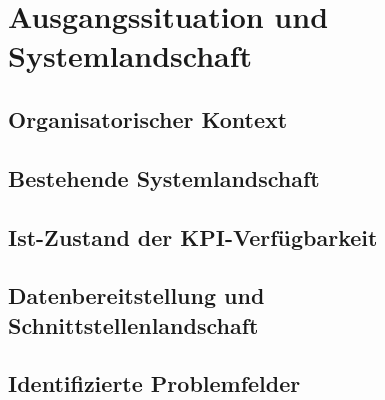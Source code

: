 \section{Ausgangssituation und Systemlandschaft}

\subsection{Organisatorischer Kontext}

\subsection{Bestehende Systemlandschaft}

\subsection{Ist-Zustand der KPI-Verfügbarkeit}

\subsection{Datenbereitstellung und Schnittstellenlandschaft}

\subsection{Identifizierte Problemfelder}
